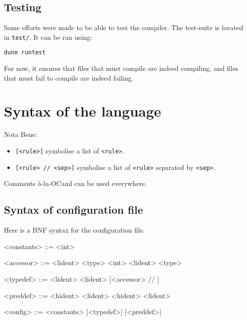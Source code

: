 \documentclass[10pt,a4paper]{article}
\begin{document}
\subsection{Testing}
Some efforts were made to be able to test the compiler. The test-suite is located in \verb|test/|. It can be ran using:
\begin{verbatim}
dune runtest
\end{verbatim}
For now, it ensures that files that must compile are indeed compiling, and files that must fail to compile are indeed failing.

\section{Syntax of the language}
Nota Bene:
\begin{itemize}
\item \verb|[<rule>]| symbolise a list of \verb|<rule>|.
\item \verb|[<rule> // <sep>]| symbolise a list of \verb|<rule>| separated by \verb|<sep>|.
\end{itemize}

Comments à-la-OCaml can be used everywhere.

\subsection{Syntax of configuration file}
\label{subsec:syntaxconfig} Here is a BNF syntax for the configuration file.
\begin{grammar}
  <constants> ::=
    \lit{=} <int>

  <accessor> ::=
  <lident>  <type>
  \alt <int> <lident>  <type>

  <typedef> ::=
   <lident>
  \alt {} <lident> \lit{=} [<accessor> // \lit{|}]

  <preddef> ::=
   <hident>  <lident>
  \alt {} <hident>  <lident>

  <config> ::=
  <constants> [<typedef>] [<preddef>]
\end{grammar}
\end{document}

